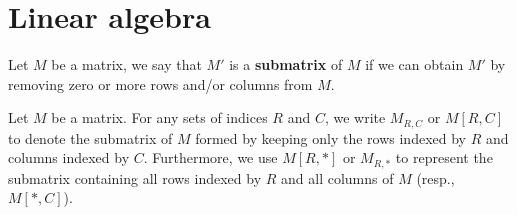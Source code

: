 \section{Linear algebra}
\label{sec:linear_algebra}


\begin{definition}[Submatrix]
    Let \(M\) be a matrix, we say that \(M'\) is a \textbf{submatrix} of \(M\) if we can obtain \(M'\) by removing zero or more rows and/or columns from \(M\).
\end{definition}
\noindent
Let \(M\) be a matrix. 
For any sets of indices \(R\) and \(C\), we write \(M_{R,C}\) or \(M[R,C]\) to denote the submatrix of \(M\) formed by keeping only the rows indexed by \(R\) and columns indexed by \(C\). 
Furthermore, we use \(M[R,*]\) or \(M_{R, *}\) to represent the submatrix containing all rows indexed by \(R\) and all columns of \(M\) (resp., \(M[*, C]\)).
% 

